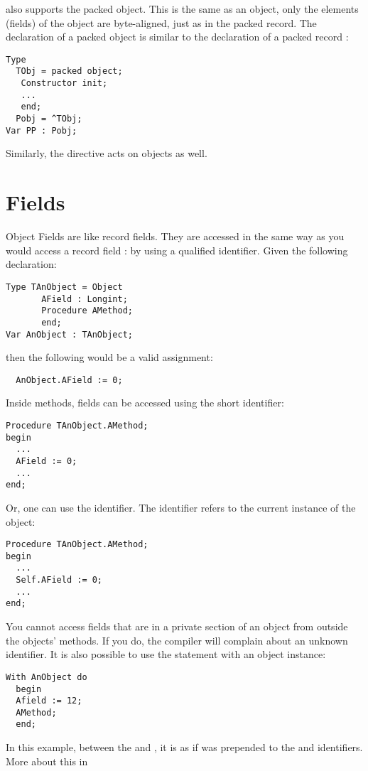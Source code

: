 \documentclass{report}
\begin{document}
\begin{remark}
\fpc also supports the packed object. This is the same as an object, only
the elements (fields) of the object are byte-aligned, just as in the packed
record.
The declaration of a packed object is similar to the declaration
of a packed record :
\begin{verbatim}
Type
  TObj = packed object;
   Constructor init;
   ...
   end;
  Pobj = ^TObj;
Var PP : Pobj;
\end{verbatim}
Similarly, the  directive acts on objects as well.
\end{remark}
\section{Fields}
Object Fields are like record fields. They are accessed in the same way as
you would access a record field : by using a qualified identifier. Given the
following declaration:
\begin{verbatim}
Type TAnObject = Object
       AField : Longint;
       Procedure AMethod;
       end;
Var AnObject : TAnObject;
\end{verbatim}
then the following would be a valid assignment:
\begin{verbatim}
  AnObject.AField := 0;
\end{verbatim}
Inside methods, fields can be accessed using the short identifier:
\begin{verbatim}
Procedure TAnObject.AMethod;
begin
  ...
  AField := 0;
  ...
end;
\end{verbatim}
Or, one can use the  identifier. The  identifier refers
to the current instance of the object:
\begin{verbatim}
Procedure TAnObject.AMethod;
begin
  ...
  Self.AField := 0;
  ...
end;
\end{verbatim}
You cannot access fields that are in a private section of an object from
outside the objects' methods. If you do, the compiler will complain about
an unknown identifier.
It is also possible to use the  statement with an object instance:
\begin{verbatim}
With AnObject do
  begin
  Afield := 12;
  AMethod;
  end;
\end{verbatim}
In this example, between the  and , it is as if
 was prepended to the  and 
identifiers. More about this in 
\end{document}
